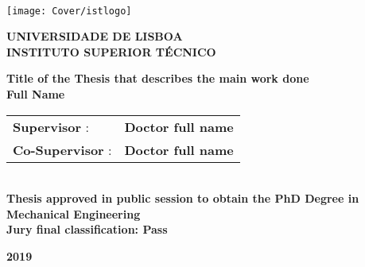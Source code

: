 \setcounter{page}{1} 


\thispagestyle{empty}
\begin{flushleft} ~\\ \vspace{-12mm} \hspace{-12mm}  \texttt{[image: Cover/istlogo]} 
 
\centering
\LARGE \textbf{UNIVERSIDADE DE LISBOA \\ INSTITUTO SUPERIOR TÉCNICO}
\vspace{30mm}

 \vspace{5mm}
 
\centering
\LARGE \textbf{Title of the Thesis that describes the main work done}
\\ \vspace{25mm}  %
\LARGE \textbf{Full Name} \\
\vspace{3cm}

\begin{minipage}{\textwidth}
\begin{tabularx}{\textwidth}{ l @{ } l }
\textbf{Supervisor} : & \textbf{Doctor full name}\\
\textbf{Co-Supervisor} :  & \textbf{Doctor full name}\\
\end{tabularx}

\end{minipage}
%
\\ \vspace{20mm}
\centering\LARGE
\textbf{Thesis approved in public session to obtain the PhD Degree in Mechanical Engineering}\\
\vspace{8mm}
\LARGE \textbf{Jury final classification:  Pass}\\
 
\vspace{20mm}

\LARGE \textbf{2019} \\
\let\thepage\relax
\end{flushleft}
\pagebreak
